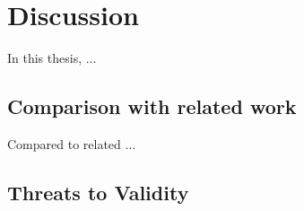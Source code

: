 \chapter{Discussion}
\label{chap:discussion}

In this thesis, ...

\section{Comparison with related work}
Compared to related ...

\section{Threats to Validity}
